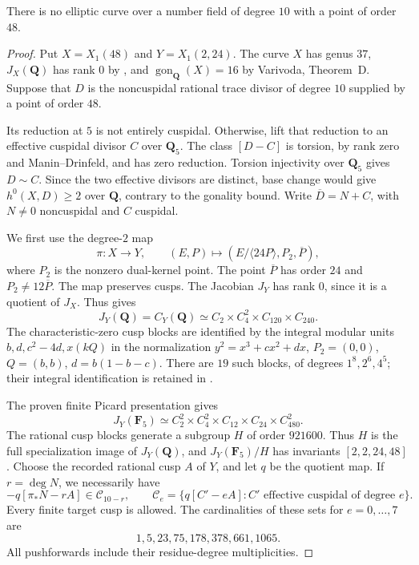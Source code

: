 

\begin{proposition}\label{prop:decic48}
There is no elliptic curve over a number field of degree $10$ with a point
of order $48$.
\end{proposition}
\begin{proof}
Put $X=X_1(48)$ and $Y=X_1(2,24)$. The curve $X$ has genus $37$,
$J_X(\mathbf Q)$ has rank $0$ by \cite[Theorem~3.1(2)]{DEHMZ}, and
$\operatorname{gon}_{\mathbf Q}(X)=16$ by Varivoda, Theorem~D.
Suppose that $D$ is the noncuspidal rational trace divisor of degree $10$
supplied by a point of order $48$.

Its reduction at $5$ is not entirely cuspidal. Otherwise, lift that
reduction to an effective cuspidal divisor $C$ over $\mathbf Q_5$.
The class $[D-C]$ is torsion, by rank zero and Manin--Drinfeld, and has
zero reduction. Torsion injectivity over $\mathbf Q_5$ gives $D\sim C$.
Since the two effective divisors are distinct, base change would give
$h^0(X,D)\geq2$ over $\mathbf Q$, contrary to the gonality bound.
Write $\overline D=N+C$, with $N\ne0$ noncuspidal and $C$ cuspidal.

We first use the degree-$2$ map
\[
 \pi:X\longrightarrow Y,\qquad
 (E,P)\longmapsto
 (E/\langle24P\rangle,P_2,\overline P),
\]
where $P_2$ is the nonzero dual-kernel point. The point $\overline P$
has order $24$ and $P_2\ne12\overline P$. The map preserves cusps.
The Jacobian $J_Y$ has rank $0$, since it is a quotient of $J_X$.
Thus \cite[Theorem~3.1, Proposition~4.16 and Table~3]{DEHMZ} gives
\[
 J_Y(\mathbf Q)=C_Y(\mathbf Q)
 \simeq C_2\times C_4^2\times C_{120}\times C_{240}.
\]
The characteristic-zero cusp blocks are identified by the integral
modular units $b,d,c^2-4d,x(kQ)$ in the normalization
$y^2=x^3+cx^2+dx$, $P_2=(0,0)$, $Q=(b,b)$,
$d=b(1-b-c)$. There are $19$ such blocks, of degrees $1^8,2^6,4^5$;
their integral identification is retained in
.

The proven finite Picard presentation gives
\[
 J_Y(\mathbf F_5)\simeq C_2^2\times C_4^2\times C_{12}
                 \times C_{24}\times C_{480}^2.
\]
The rational cusp blocks generate a subgroup $H$ of order $921600$.
Thus $H$ is the full specialization image of $J_Y(\mathbf Q)$,
and $J_Y(\mathbf F_5)/H$ has invariants $[2,2,24,48]$.
Choose the recorded rational cusp $A$ of $Y$, and let $q$ be the
quotient map. If $r=\deg N$, we necessarily have
\[
 -q[\pi_*N-rA]\in\mathcal C_{10-r},\qquad
 \mathcal C_e=\{q[C'-eA]:C'\text{ effective cuspidal of degree }e\}.
 \tag{48.1}
\]
Every finite target cusp is allowed. The cardinalities of these sets
for $e=0,\ldots,7$ are
\[
 1,5,23,75,178,378,661,1065.
\]
All pushforwards include their residue-degree multiplicities.


\end{proof}
